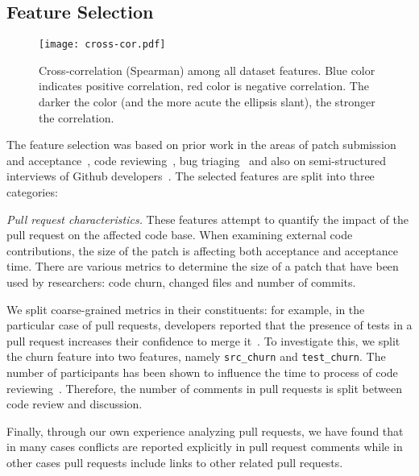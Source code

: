 \documentclass{sig-alternate}
\begin{document}
\subsection{Feature Selection} 

\begin{figure}
  \begin{center}
    \texttt{[image: cross-cor.pdf]}
  \end{center}
  \caption{Cross-correlation (Spearman) among all dataset features. Blue color indicates positive correlation, red color is negative correlation. The darker
  the color (and the more acute the ellipsis slant), the stronger the correlation.}
  \label{fig:features}
\end{figure}

The feature selection was based on prior work in the areas of patch submission
and acceptance~\cite{Baysa12}, code
reviewing~\cite{Rigby13}, bug triaging~\cite{Giger10} and also on
semi-structured interviews of Github developers~\cite{Dabbi12, Pham13}.
The selected features are split into three categories:

  \emph{Pull request characteristics.} These features attempt to quantify the
  impact of the pull request on the affected code base. When examining external
  code contributions, the size of the patch is affecting both acceptance and
  acceptance time. There are various metrics to determine the size of a patch
  that have been used by researchers: code churn, changed files and number of
  commits.
  
  We split coarse-grained metrics in their constituents: for example,
  in the particular case of pull requests, developers reported that
  the presence of tests in a pull request increases their confidence to merge
  it~\cite{Pham13}. To investigate this, we split the churn feature into two
  features, namely \texttt{src\_churn} and \texttt{test\_churn}. The number of
  participants has been shown to influence the time to process of code
  reviewing~\cite{Rigby13}. Therefore, the number of comments in pull requests
  is split between code review and discussion.

  Finally, through our own experience analyzing pull
  requests, we have found that in many cases conflicts are reported explicitly
  in pull request comments while in other cases pull requests include links to
  other related pull requests.
\end{document}
